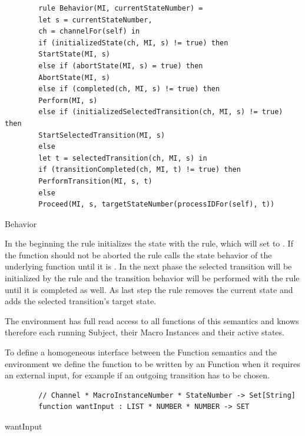 \begin{listing}[H]
	\begin{verbatim}
		rule Behavior(MI, currentStateNumber) =
		let s = currentStateNumber,
		ch = channelFor(self) in
		if (initializedState(ch, MI, s) != true) then
		StartState(MI, s)
		else if (abortState(MI, s) = true) then
		AbortState(MI, s)
		else if (completed(ch, MI, s) != true) then
		Perform(MI, s)
		else if (initializedSelectedTransition(ch, MI, s) != true) then
		StartSelectedTransition(MI, s)
		else
		let t = selectedTransition(ch, MI, s) in
		if (transitionCompleted(ch, MI, t) != true) then
		PerformTransition(MI, s, t)
		else
		Proceed(MI, s, targetStateNumber(processIDFor(self), t))
	\end{verbatim}
	\caption{Behavior}
	\label{lst:shortasm:Behavior}
\end{listing}


In the beginning the  rule initializes the state with the
 rule, which will set  to
. If the function should not be aborted the 
rule calls the state behavior of the underlying function until it is
.
In the next phase the selected transition will be initialized by the
 rule and the transition behavior will be performed with
the  rule until it is completed as well. As last step
the  rule removes the current state and adds the selected
transition's target state.


The environment has full read access to all functions of this semantics and knows
therefore each running Subject, their Macro Instances and their active states.

To define a homogeneous interface between the Function semantics and the environment we
define the function  to be written by an Function when it
requires an external input, for example if an outgoing transition has to be chosen.



\begin{listing}[H]
	\begin{verbatim}
		// Channel * MacroInstanceNumber * StateNumber -> Set[String]
		function wantInput : LIST * NUMBER * NUMBER -> SET
	\end{verbatim}
	\caption{wantInput}
	\label{lst:shortasm:wantInput}
\end{listing}


